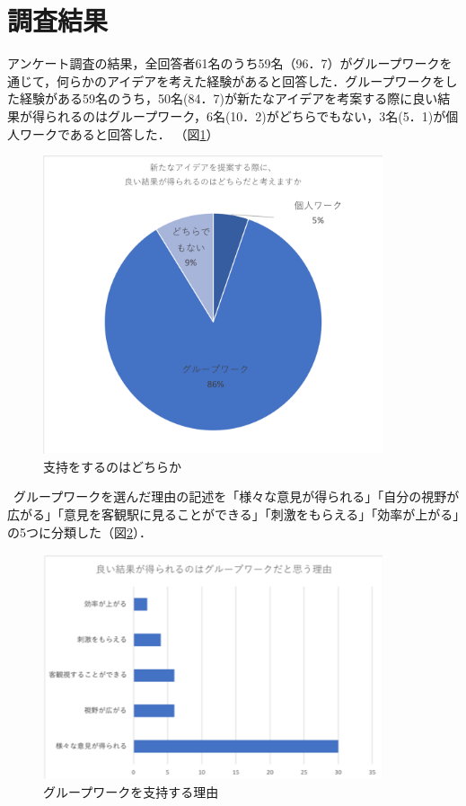 \documentclass{funthesis}
\begin{document}
\section{調査結果}

アンケート調査の結果，全回答者61名のうち59名（96．7）がグループワークを通じて，何らかのアイデアを考えた経験があると回答した．グループワークをした経験がある59名のうち，50名(84．7)が新たなアイデアを考案する際に良い結果が得られるのはグループワーク，6名(10．2)がどちらでもない，3名(5．1)が個人ワークであると回答した．
（図\ref{graph0}）
\begin{figure}[h]
 \centering
   \includegraphics[width=100mm]{figures/en1.png}
 \caption{支持をするのはどちらか}
 \label{graph0}
\end{figure}

\ グループワークを選んだ理由の記述を「様々な意見が得られる」「自分の視野が広がる」「意見を客観駅に見ることができる」「刺激をもらえる」「効率が上がる」の5つに分類した（図\ref{graph1}）．
\begin{figure}[h]
 \centering
   \includegraphics[width=100mm]{figures/graph1.png}
 \caption{グループワークを支持する理由}
 \label{graph1}
\end{figure}
\end{document}
